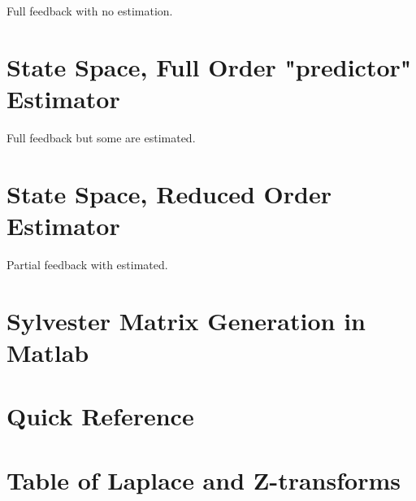 \documentclass{article}
\begin{document}
Full feedback with no estimation.

\section{State Space, Full Order "predictor" Estimator}

Full feedback but some are estimated.

\section{State Space, Reduced Order Estimator}

Partial feedback with estimated.

\clearpage
\printbibliography[heading=bibintoc]

\clearpage
\appendix

\section{Sylvester Matrix Generation in Matlab}
\label{app:sylvester}




\section{Quick Reference}

\section{Table of Laplace and Z-transforms}
\end{document}
